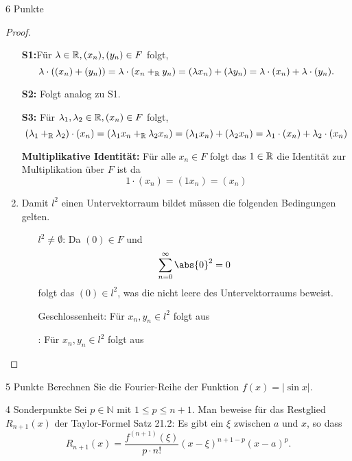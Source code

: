 \documentclass{problemset}
\begin{document}
\begin{problem}{6 Punkte}
\begin{proof}
\begin{enumerate}
              \textbf{S1:}Für \(\lambda \in \mathbb{R}, (x_n), (y_n) \in F\) folgt, \[
                  \lambda \cdot ((x_n) + (y_n)) = \lambda \cdot (x_n +_{\mathbb{R}} y_n) = (\lambda x_n) + (\lambda y_n) = \lambda \cdot (x_n) + \lambda \cdot (y_n).
              \]

              \textbf{S2:} Folgt analog zu S1.

              \textbf{S3:} Für \(\lambda_1, \lambda_2 \in \mathbb{R}, (x_n) \in F\) folgt, \[
                  (\lambda_1 +_{\mathbb{R}} \lambda_2) \cdot (x_n) = (\lambda_1 x_n +_{\mathbb{R}} \lambda_2 x_n) = (\lambda_1 x_n) + (\lambda_2 x_n) = \lambda_1 \cdot (x_n) + \lambda_2 \cdot (x_n)
              \]

              \textbf{Multiplikative Identität:} Für alle \(x_n \in F\) folgt das \(1 \in \mathbb{R}\) die Identität zur Multiplikation über \(F\) ist da \[
                  1 \cdot (x_n) = (1 x_n) = (x_n)
              \]

        \item Damit \(l^2\) einen Untervektorraum bildet müssen die folgenden
              Bedingungen gelten.

              \begin{enumerate}
                  \item[\(l^2 \neq \emptyset\):] Da \((0) \in F\) und \[
                            \sum_{n = 0}^\infty \abs{0}^2 = 0
                        \] folgt das \((0) \in l^2\), was die nicht leere des
                        Untervektorraums beweist.

                  \item[Geschlossenheit:] Für \(x_n, y_n \in l^2\) folgt aus

                  \item[\(\):] Für \(x_n, y_n \in l^2\) folgt aus
              \end{enumerate}
    \end{enumerate}

\end{proof}

\end{problem}

\begin{problem}{5 Punkte}
Berechnen Sie die Fourier-Reihe der Funktion $f(x) = |\sin x|$.
\end{problem}

\begin{problem}{4 Sonderpunkte}
Sei $p \in \mathbb{N}$ mit $1 \leq p \leq n + 1$. Man beweise für das Restglied $R_{n+1}(x)$ der Taylor-Formel Satz 21.2: Es gibt ein $\xi$ zwischen $a$ und $x$, so dass
\[ R_{n+1}(x) = \frac{f^{(n+1)}(\xi)}{p \cdot n!} (x - \xi)^{n+1-p} (x - a)^p. \]
\end{problem}
\end{document}
